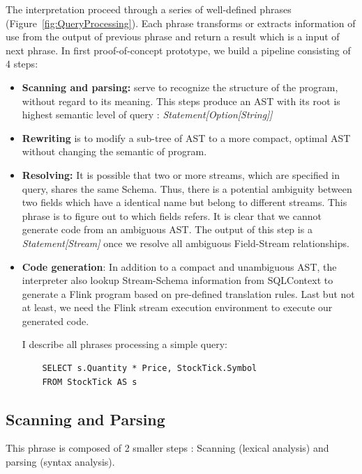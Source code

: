 The interpretation proceed through a series of well-defined phrases (Figure~\ref{fig:QueryProcessing}). Each phrase transforms or extracts information of use from the output of previous phrase and return a result which is a input of next phrase. In first proof-of-concept prototype, we build a pipeline consisting of 4 steps:
\begin{itemize}
	\item \textbf{Scanning and parsing:} serve to recognize the structure of the program, without regard to its meaning. This steps produce an AST with its root is highest semantic level of query : \textit{Statement[Option[String]]}

	\item \textbf{Rewriting} is to modify a sub-tree of AST to a more compact, optimal AST without changing the semantic of program.
	
	\item \textbf{Resolving:} It is possible that two or more streams, which are specified in query,  shares the same Schema. Thus, there is a potential ambiguity between two fields which have a identical name but belong to different streams. This phrase is to figure out to which fields refers. It is clear that we cannot generate code from an ambiguous AST. The output of this step is a \textit{Statement[Stream]} once we resolve all ambiguous Field-Stream relationships.
	
	\item \textbf{Code generation}: In addition to a compact and unambiguous AST, the interpreter also lookup Stream-Schema information from SQLContext to generate a Flink program based on pre-defined translation rules. Last but not at least, we need the Flink stream execution environment to execute our generated code.
	
I describe all phrases processing a simple query: 
\begin{lstlisting}
	SELECT s.Quantity * Price, StockTick.Symbol 
	FROM StockTick AS s
\end{lstlisting}

\end{itemize}
\subsection{Scanning and Parsing}



This phrase is composed of 2 smaller steps : Scanning (lexical analysis) and parsing (syntax analysis).

